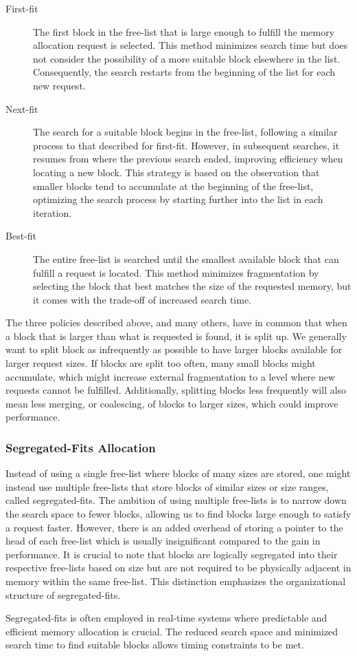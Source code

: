 \begin{description}
    \item[First-fit]
        The first block in the free-list that is large enough to fulfill the memory allocation request is selected. This method minimizes search time but does not consider the possibility of a more suitable block elsewhere in the list. Consequently, the search restarts from the beginning of the list for each new request.
    \item[Next-fit]
        The search for a suitable block begins in the free-list, following a similar process to that described for first-fit. However, in subsequent searches, it resumes from where the previous search ended, improving efficiency when locating a new block. This strategy is based on the observation that smaller blocks tend to accumulate at the beginning of the free-list, optimizing the search process by starting further into the list in each iteration.
    \item[Best-fit]
        The entire free-list is searched until the smallest available block that can fulfill a request is located. This method minimizes fragmentation by selecting the block that best matches the size of the requested memory, but it comes with the trade-off of increased search time.
\end{description}

The three policies described above, and many others, have in common that when a block that is larger than what is requested is found, it is split up. We generally want to split block as infrequently as possible to have larger blocks available for larger request sizes. If blocks are split too often, many small blocks might accumulate, which might increase external fragmentation to a level where new requests cannot be fulfilled. Additionally, splitting blocks less frequently will also mean less merging, or coalescing, of blocks to larger sizes, which could improve performance.

\subsubsection{Segregated-Fits Allocation}
Instead of using a single free-list where blocks of many sizes are stored, one might instead use multiple free-lists that store blocks of similar sizes or size ranges, called segregated-fits. The ambition of using multiple free-lists is to narrow down the search space to fewer blocks, allowing us to find blocks large enough to satisfy a request faster. However, there is an added overhead of storing a pointer to the head of each free-list which is usually insignificant compared to the gain in performance. It is crucial to note that blocks are logically segregated into their respective free-lists based on size but are not required to be physically adjacent in memory within the same free-list. This distinction emphasizes the organizational structure of segregated-fits.

Segregated-fits is often employed in real-time systems where predictable and efficient memory allocation is crucial. The reduced search space and minimized search time to find suitable blocks allows timing constraints to be met.

